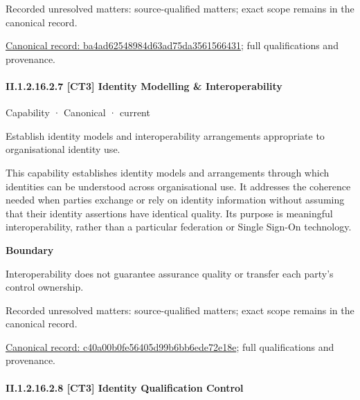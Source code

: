 {\small Recorded unresolved matters: source-qualified matters; exact scope remains in the canonical record.}\par
{\footnotesize \href{../../../../continuum/strategy/capability/ba4ad62548984d63ad75da3561566431.md}{Canonical record: ba4ad62548984d63ad75da3561566431}; full qualifications and provenance.}\par
\paragraph*{II.1.2.16.2.7 [CT3] Identity Modelling \& Interoperability}
\label{navigation:II.1.2.16.2.7}

\label{element:c40a00b0fe56405d99b6bb6ede72e18e}
{\small Capability · Canonical · current}\par

Establish identity models and interoperability arrangements appropriate to organisational identity use.



This capability establishes identity models and arrangements through which identities can be understood across organisational use. It addresses the coherence needed when parties exchange or rely on identity information without assuming that their identity assertions have identical quality. Its purpose is meaningful interoperability, rather than a particular federation or Single Sign-On technology.



\textbf{Boundary}



Interoperability does not guarantee assurance quality or transfer each party's control ownership.


{\small Recorded unresolved matters: source-qualified matters; exact scope remains in the canonical record.}\par
{\footnotesize \href{../../../../continuum/strategy/capability/c40a00b0fe56405d99b6bb6ede72e18e.md}{Canonical record: c40a00b0fe56405d99b6bb6ede72e18e}; full qualifications and provenance.}\par
\paragraph*{II.1.2.16.2.8 [CT3] Identity Qualification Control}
\label{navigation:II.1.2.16.2.8}

